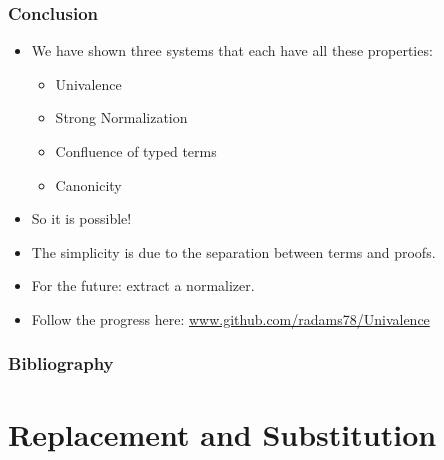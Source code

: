 \begin{frame}
\frametitle{Conclusion}
\begin{itemize}[<+->]
\item
We have shown three systems that each have all these properties:
\begin{itemize}
\item
Univalence
\item
Strong Normalization
\item
Confluence of typed terms
\item
Canonicity
\end{itemize}
\item
So it is possible!
\item
The simplicity is due to the separation between terms and proofs.
\item
For the future: extract a normalizer.
\item
Follow the progress here: \url{www.github.com/radams78/Univalence}
\end{itemize}
\end{frame}

\begin{frame}
\frametitle{Bibliography}

\end{frame}

\appendix

\section{Replacement and Substitution}
\label{appendix:repsub}














